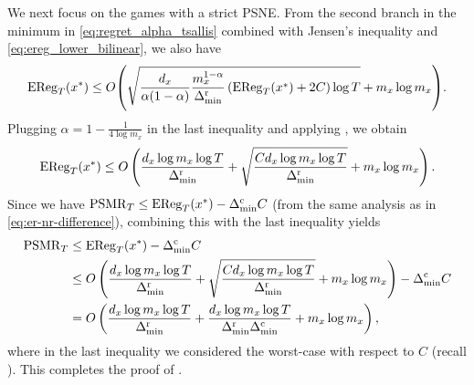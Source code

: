 We next focus on the games with a strict PSNE.
From the second branch in the minimum in \eqref{eq:regret_alpha_tsallis} combined with Jensen's inequality and \eqref{eq:ereg_lower_bilinear}, we also have
\begin{equation*}
    \ER_T(x^*)
    \leq
    O\rbr{
    \sqrt{ 
        \frac{d_x}{\alpha(1-\alpha)} \frac{m_x^{1-\alpha}}{\DRmin} 
        \left( \ER_T(x^*) + 2 C \right)
        \log T
    }
    + m_x \log m_x
    }
    .
\end{equation*}
Plugging $\alpha=1-\frac{1}{4\log m_x}$ in the last inequality and applying ,
we obtain
\begin{equation}
    \mathrm{EReg}_T(x^*)
    \leq
    O\left(
    \frac{d_x \log m_x \log T}{\Delta^{\mathrm{r}}_{\mathrm{min}}}
    +
    \sqrt{\frac{C d_x \log m_x \log T}{\Delta^{\mathrm{r}}_{\mathrm{min}}}}
    +
    m_x \log m_x
    \right)
    .
    \nonumber
\end{equation}
Since we have $\mathrm{PSMR}_T \leq \mathrm{EReg}_T(x^*) - \Delta^{\mathrm{c}}_{\mathrm{min}} C$ (from the same analysis as in \eqref{eq:er-nr-difference}), combining this with the last inequality yields
\begin{align*}
    \mathrm{PSMR}_T 
    &
    \leq
    \mathrm{EReg}_T(x^*) - \Delta^{\mathrm{c}}_{\mathrm{min}} C
    \nonumber \\
    &\leq
    O\left(
    \frac{d_x \log m_x \log T}{\Delta^{\mathrm{r}}_{\mathrm{min}}}
    +
    \sqrt{\frac{C d_x \log m_x \log T}{\Delta^{\mathrm{r}}_{\mathrm{min}}}}
    +
    m_x \log m_x
    \right)
    - 
    \Delta^{\mathrm{c}}_{\mathrm{min}} C
    \\
    &=
    O\left(
    \frac{d_x \log m_x \log T}{\Delta^{\mathrm{r}}_{\mathrm{min}}}
    +
    \frac{d_x \log m_x \log T}{\Delta^{\mathrm{r}}_{\mathrm{min}} \Delta^{\mathrm{c}}_{\mathrm{min}}}
    +
    m_x \log m_x
    \right)
    ,
\end{align*}
where in the last inequality we considered the worst-case with respect to $C$ (recall ).
This completes the proof of .
%




